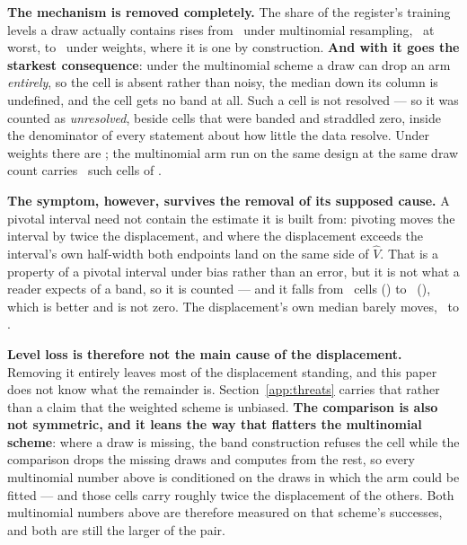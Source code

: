 \noindent\textbf{The mechanism is removed completely.} The share of the
register's training levels a draw actually contains rises from
\levelShareMult\ under multinomial resampling, \levelShareMultMin\ at
worst, to \levelShareWeighted\ under weights, where it is one by
construction. \textbf{And with it goes the starkest consequence}: under the
multinomial scheme a draw can drop an arm
\emph{entirely}, so the cell is absent rather than noisy, the median down its
column is undefined, and the cell gets no band at all. Such a cell is not
resolved --- so it was counted as \emph{unresolved}, beside cells that were
banded and straddled zero, inside the denominator of every statement about how
little the data resolve. Under weights there are \nUnbandableCells; the
multinomial arm run on the same design at the same draw count carries
\nUnbandableSameDesign\ such cells of \nUnbandableSameDesignOf.

\noindent\textbf{The symptom, however, survives the removal of its supposed
cause.} A pivotal interval need not contain the estimate it is built from:
pivoting moves the interval by twice the displacement, and where the
displacement exceeds the interval's own half-width both endpoints land on the
same side of $\hat{V}$. That is a property of a pivotal interval under bias
rather than an error, but it is not what a reader expects of a band, so it is
counted --- and it falls from \nExcludesMult\ cells
(\shareExcludesMultPct) to \nExcludesWeighted\ (\shareExcludesWeightedPct),
which is better and is not zero. The displacement's own median barely moves,
\dispMedianMult\ to \dispMedianWeighted.

\noindent\textbf{Level loss is therefore not the main cause of the
displacement.} Removing it entirely leaves most of the displacement standing,
and this paper does not know what the remainder is.
Section~\ref{app:threats} carries that rather than a claim that the weighted
scheme is unbiased. \textbf{The comparison is also not symmetric, and it leans
the way that flatters the multinomial scheme}: where a draw is missing, the band construction
refuses the cell while the comparison drops the missing draws and computes
from the rest, so every multinomial number above is conditioned on the draws in
which the arm could be fitted --- and those cells carry roughly twice the
displacement of the others. Both multinomial numbers above are therefore
measured on that scheme's successes, and both are still the larger of the
pair.

